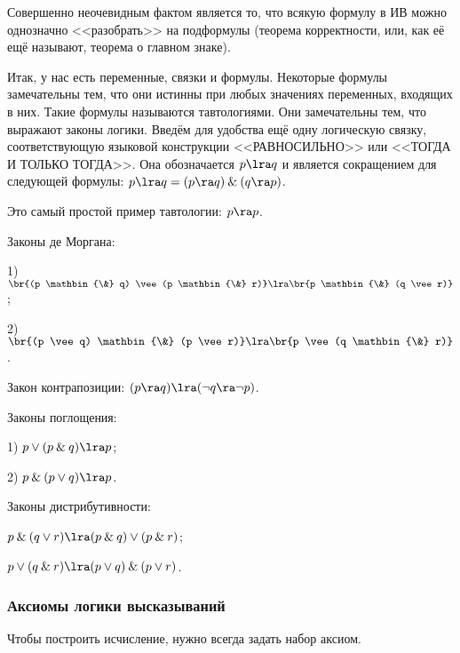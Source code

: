 \documentclass[a4paper,draft]{article}
\let\amper\&
\def\&{\mathbin{\amper}}
\begin{document}
\begin{note}
  Совершенно неочевидным фактом является то, что всякую формулу в ИВ можно однозначно <<разобрать>>
  на подформулы (теорема корректности, или, как её ещё называют, теорема о главном знаке).
\end{note}

Итак, у нас есть переменные, связки и формулы. Некоторые формулы замечательны тем, что они истинны при любых значениях
переменных, входящих в них. Такие формулы называются тавтологиями. Они замечательны тем, что
выражают законы логики. Введём для удобства ещё одну логическую связку, соответствующую
языковой конструкции <<РАВНОСИЛЬНО>> или <<ТОГДА И ТОЛЬКО ТОГДА>>. Она обозначается
$p \lra q$ и является сокращением для следующей формулы: $p \lra q = (p \ra q) \& (q \ra p)$.

\begin{ex}
  Это самый простой пример тавтологии: $p \ra p$.
\end{ex}

\begin{ex}
  Законы де Моргана:\par
  1) $\br{(p \& q) \vee (p \& r)} \lra \br{p \& (q \vee r)}$;\par
  2) $\br{(p \vee q) \& (p \vee r)} \lra \br{p \vee (q \& r)}$.
\end{ex}

\begin{ex}
  Закон контрапозиции: $(p \ra q) \lra (\neg q \ra \neg p)$.
\end{ex}

\begin{ex}
  Законы поглощения:\par
  1) $p \vee (p \& q) \lra p$;\par
  2) $p \& (p \vee q) \lra p$.
\end{ex}

\begin{ex}
  Законы дистрибутивности:\par
  $p \& (q \vee r) \lra (p \& q) \vee (p \& r)$;\par
  $p \vee (q \& r) \lra (p \vee q) \& (p \vee r)$.
\end{ex}

\subsubsection{Аксиомы логики высказываний}

Чтобы построить исчисление, нужно всегда задать набор аксиом.
\end{document}
